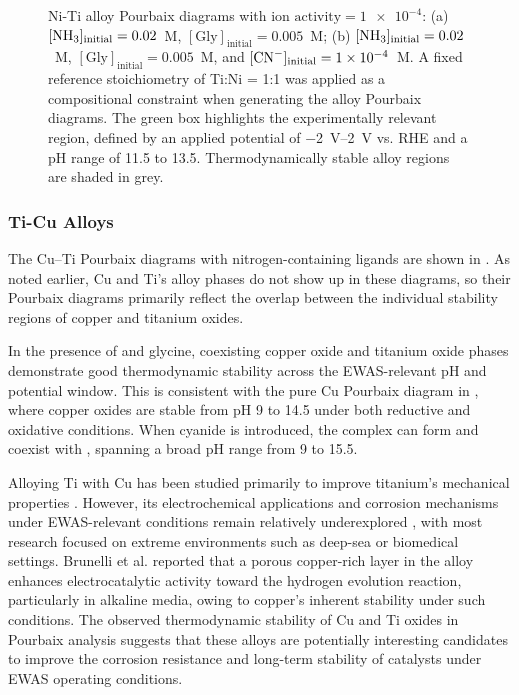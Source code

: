 \documentclass[journal=jacsat,manuscript=article]{achemso}
\begin{document}
\begin{figure}[htbp]
\begin{subfigure}[b]{0.45\textwidth}
    \end{subfigure}
    \caption{Ni-Ti alloy Pourbaix diagrams with $\text{ion activity} = \num{1e-4}$: (a) $[\ce{NH3}]_\text{initial} = 0.02$~M, $[\text{Gly}]_\text{initial} = 0.005$~M; (b) $[\ce{NH3}]_\text{initial} = 0.02$~M, $[\text{Gly}]_\text{initial} = 0.005$~M, and $[\ce{CN^-}]_\text{initial} = \num{1e-4}$~M. A fixed reference stoichiometry of Ti:Ni = 1:1 was applied as a compositional constraint when generating the alloy Pourbaix diagrams. The green box highlights the experimentally relevant region, defined by an applied potential of \SIrange{-2}{2}{V} vs. RHE and a pH range of 11.5 to 13.5. Thermodynamically stable alloy regions are shaded in grey.}
    \label{fig:TiNi_alloy_Pourbaix}
\end{figure}


\subsubsection{Ti-Cu Alloys}
The Cu–Ti Pourbaix diagrams with nitrogen-containing ligands are shown in . As noted earlier, Cu and Ti's alloy phases do not show up in these diagrams, so their Pourbaix diagrams primarily reflect the overlap between the individual stability regions of copper and titanium oxides.

In the presence of  and glycine, coexisting copper oxide and titanium oxide phases demonstrate good thermodynamic stability across the EWAS-relevant pH and potential window. This is consistent with the pure Cu Pourbaix diagram in , where copper oxides are stable from pH 9 to 14.5 under both reductive and oxidative conditions. When cyanide is introduced, the  complex can form and coexist with , spanning a broad pH range from 9 to 15.5.

Alloying Ti with Cu has been studied primarily to improve titanium’s mechanical properties \cite{Osorio2010ElectrochemicalApplications, Wang2019OptimizationImplant, Fotopoulos2024ModelingAlloys}. However, its electrochemical applications and corrosion mechanisms under EWAS-relevant conditions remain relatively underexplored \cite{Nagarjuna1997EffectCopper, Suzuki2003ElectricalAlloys, Vorotilo2020DFTRe-oxidation, Li2025ApplicationReview}, with most research focused on extreme environments such as deep-sea or biomedical settings. Brunelli et al. \cite{Brunelli2001ElectrochemicalAlloys} reported that a porous copper-rich layer in the alloy enhances electrocatalytic activity toward the hydrogen evolution reaction, particularly in alkaline media, owing to copper’s inherent stability under such conditions. The observed thermodynamic stability of Cu and Ti oxides in Pourbaix analysis suggests that these alloys are potentially interesting candidates to improve the corrosion resistance and long-term stability of catalysts under EWAS operating conditions.
\end{document}
